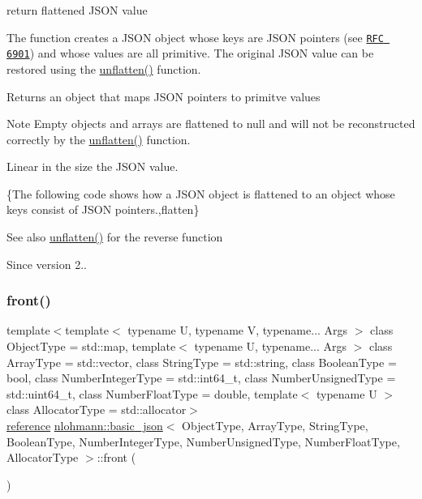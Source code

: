return flattened J\+S\+ON value 

The function creates a J\+S\+ON object whose keys are J\+S\+ON pointers (see \href{https://tools.ietf.org/html/rfc6901}{\tt R\+FC 6901}) and whose values are all primitive. The original J\+S\+ON value can be restored using the \hyperlink{classnlohmann_1_1basic__json_abc459edfac71c4ecc9347731f722026b}{unflatten()} function.

\begin{DoxyReturn}{Returns}
an object that maps J\+S\+ON pointers to primitve values
\end{DoxyReturn}
\begin{DoxyNote}{Note}
Empty objects and arrays are flattened to {\ttfamily null} and will not be reconstructed correctly by the \hyperlink{classnlohmann_1_1basic__json_abc459edfac71c4ecc9347731f722026b}{unflatten()} function.
\end{DoxyNote}
Linear in the size the J\+S\+ON value.

\{The following code shows how a J\+S\+ON object is flattened to an object whose keys consist of J\+S\+ON pointers.,flatten\}

\begin{DoxySeeAlso}{See also}
\hyperlink{classnlohmann_1_1basic__json_abc459edfac71c4ecc9347731f722026b}{unflatten()} for the reverse function
\end{DoxySeeAlso}
\begin{DoxySince}{Since}
version 2.. 
\end{DoxySince}
\hypertarget{classnlohmann_1_1basic__json_aa45753034bea87f9d2c0c42ace9ff75c}{}\label{classnlohmann_1_1basic__json_aa45753034bea87f9d2c0c42ace9ff75c} 
\subsubsection{\texorpdfstring{front()}{front()}\hspace{0.1cm}{\footnotesize\ttfamily [1/2]}}
{\footnotesize\ttfamily template$<$template$<$ typename U, typename V, typename... Args $>$ class Object\+Type = std\+::map, template$<$ typename U, typename... Args $>$ class Array\+Type = std\+::vector, class String\+Type  = std\+::string, class Boolean\+Type  = bool, class Number\+Integer\+Type  = std\+::int64\+\_\+t, class Number\+Unsigned\+Type  = std\+::uint64\+\_\+t, class Number\+Float\+Type  = double, template$<$ typename U $>$ class Allocator\+Type = std\+::allocator$>$ \\
\hyperlink{classnlohmann_1_1basic__json_a3ec8e17be8732fe436e9d6733f52b7a3}{reference} \hyperlink{classnlohmann_1_1basic__json}{nlohmann\+::basic\+\_\+json}$<$ Object\+Type, Array\+Type, String\+Type, Boolean\+Type, Number\+Integer\+Type, Number\+Unsigned\+Type, Number\+Float\+Type, Allocator\+Type $>$\+::front (\begin{DoxyParamCaption}{ }\end{DoxyParamCaption})\hspace{0.3cm}{\ttfamily [inline]}}



